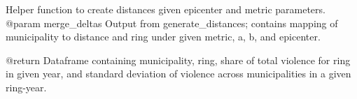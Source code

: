 \documentclass[
]{article}
\begin{document}
Helper function to create distances given epicenter and metric
parameters. @param merge\_deltas Output from generate\_distances;
contains mapping of municipality to distance and ring under given
metric, a, b, and epicenter.

@return Dataframe containing municipality, ring, share of total violence
for ring in given year, and standard deviation of violence across
municipalities in a given ring-year. 
\end{document}
